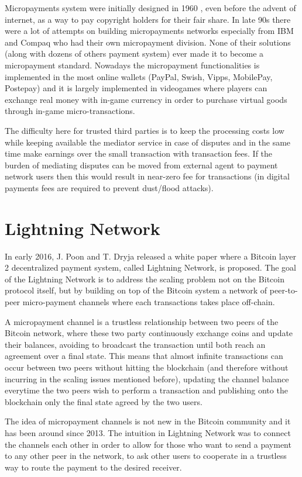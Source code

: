 		Micropayments system were initially designed in 1960 \cite{Nelson1960}, even before the advent of internet, as a way to pay copyright holders for their fair share. In late 90s there were a lot of attempts on building micropayments networks especially from IBM and Compaq who had their own micropayment division. None of their solutions (along with dozens of others payment system) ever made it to become a micropayment standard. Nowadays the micropayment functionalities is implemented in the most online wallets (PayPal, Swish, Vipps, MobilePay, Postepay) and it is largely implemented in videogames where players can exchange real money with in-game currency in order to purchase virtual goods through in-game micro-transactions. 
		
		The difficulty here for trusted third parties is to keep the processing costs low while keeping available the mediator service in case of disputes and in the same time make earnings over the small transaction with transaction fees. If the burden of mediating disputes can be moved from external agent to payment network users then this would result in near-zero fee for transactions (in digital payments fees are required to prevent dust/flood attacks).
		
		\section{Lightning Network}
		
		In early 2016, J. Poon and T. Dryja released a white paper where a Bitcoin layer 2 decentralized payment system, called Lightning Network, is proposed. The goal of the Lightning Network is to address the scaling problem not on the Bitcoin protocol itself, but by building on top of the Bitcoin system a network of peer-to-peer micro-payment channels where each transactions takes place off-chain.
		
		A micropayment channel is a trustless relationship between two peers of the Bitcoin network, where these two party continuously exchange coins and update their balances, avoiding to broadcast the transaction until both reach an agreement over a final state. This means that almost infinite transactions can occur between two peers without hitting the blockchain (and therefore without incurring in the scaling issues mentioned before), updating the channel balance everytime the two peers wish to perform a transaction and publishing onto the blockchain only the final state agreed by the two users.
		
		 The idea of micropayment channels is not new in the Bitcoin community and it has been around since 2013\cite{Micropayments:Online}\cite{Micropayments:Bitcoinj}. The intuition in Lightning Network was to connect the channels each other in order to allow for those who want to send a payment to any other peer in the network, to ask other users to cooperate in a trustless way to route the payment to the desired receiver.
		
